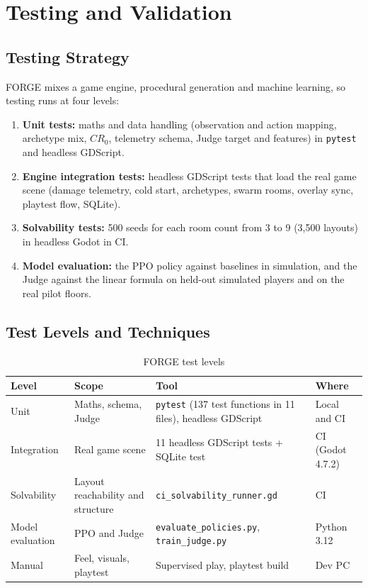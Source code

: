 \chapter{Testing and Validation}
\label{chap:testing}

\section{Testing Strategy}
FORGE mixes a game engine, procedural generation and machine learning, so testing runs at four levels:
\begin{enumerate}
    \item \textbf{Unit tests:} maths and data handling (observation and action mapping, archetype mix, $CR_0$, telemetry schema, Judge target and features) in \texttt{pytest} and headless GDScript.
    \item \textbf{Engine integration tests:} headless GDScript tests that load the real game scene (damage telemetry, cold start, archetypes, swarm rooms, overlay sync, playtest flow, SQLite).
    \item \textbf{Solvability tests:} 500 seeds for each room count from 3 to 9 (3,500 layouts) in headless Godot in CI.
    \item \textbf{Model evaluation:} the PPO policy against baselines in simulation, and the Judge against the linear formula on held-out simulated players and on the real pilot floors.
\end{enumerate}

\section{Test Levels and Techniques}
\begin{table}[!htbp]
\centering
\caption{FORGE test levels}
\label{tab:test_levels}
\small
\begin{tabular}{p{}p{}p{}p{}}
\toprule
\textbf{Level} & \textbf{Scope} & \textbf{Tool} & \textbf{Where} \\
\midrule
Unit & Maths, schema, Judge & \texttt{pytest} (137 test functions in 11 files), headless GDScript & Local and CI \\
Integration & Real game scene & 11 headless GDScript tests + SQLite test & CI (Godot 4.7.2) \\
Solvability & Layout reachability and structure & \texttt{ci\_solvability\_runner.gd} & CI \\
Model evaluation & PPO and Judge & \texttt{evaluate\_policies.py}, \texttt{train\_judge.py} & Python 3.12 \\
Manual & Feel, visuals, playtest & Supervised play, playtest build & Dev PC \\
\bottomrule
\end{tabular}
\end{table}

